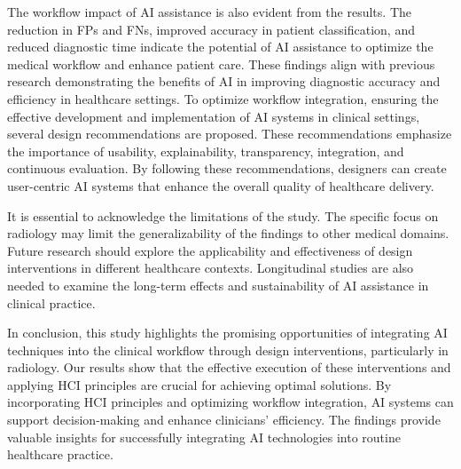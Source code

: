 The workflow impact of \ac{AI} assistance is also evident from the results.
The reduction in \acp{FP} and \acp{FN}, improved accuracy in patient classification, and reduced diagnostic time indicate the potential of \ac{AI} assistance to optimize the medical workflow and enhance patient care.
These findings align with previous research demonstrating the benefits of \ac{AI} in improving diagnostic accuracy and efficiency in healthcare settings.
To optimize workflow integration, ensuring the effective development and implementation of \ac{AI} systems in clinical settings, several design recommendations are proposed.
These recommendations emphasize the importance of usability, explainability, transparency, integration, and continuous evaluation.
By following these recommendations, designers can create user-centric \ac{AI} systems that enhance the overall quality of healthcare delivery.

It is essential to acknowledge the limitations of the study.
The specific focus on radiology may limit the generalizability of the findings to other medical domains.
Future research should explore the applicability and effectiveness of design interventions in different healthcare contexts.
Longitudinal studies are also needed to examine the long-term effects and sustainability of \ac{AI} assistance in clinical practice.

In conclusion, this study highlights the promising opportunities of integrating \ac{AI} techniques into the clinical workflow through design interventions, particularly in radiology.
Our results show that the effective execution of these interventions and applying \ac{HCI} principles are crucial for achieving optimal solutions.
By incorporating \ac{HCI} principles and optimizing workflow integration, \ac{AI} systems can support decision-making and enhance clinicians' efficiency.
The findings provide valuable insights for successfully integrating \ac{AI} technologies into routine healthcare practice.
